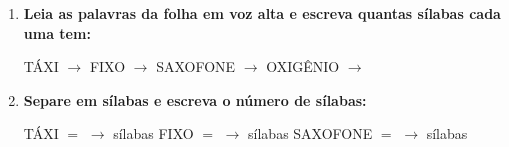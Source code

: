 \begin{exercicio}
\begin{enumerate}[resume]
  \item \textbf{Leia as palavras da folha em voz alta e escreva quantas sílabas cada uma tem:}

  \begin{center}
  TÁXI $\rightarrow$ \underline{\hspace{1cm}} \quad FIXO $\rightarrow$ \underline{\hspace{1cm}} \quad SAXOFONE $\rightarrow$ \underline{\hspace{1cm}} \quad OXIGÊNIO $\rightarrow$ \underline{\hspace{1cm}}
  \end{center}

  \item \textbf{Separe em sílabas e escreva o número de sílabas:}
  \begin{center}
  TÁXI $=$ \underline{\hspace{1.2cm}} $\rightarrow$ \underline{\hspace{0.8cm}} sílabas \quad FIXO $=$ \underline{\hspace{1.2cm}} $\rightarrow$ \underline{\hspace{0.8cm}} sílabas \quad SAXOFONE $=$ \underline{\hspace{1.2cm}} $\rightarrow$ \underline{\hspace{0.8cm}} sílabas
  \end{center}

\end{enumerate}

\end{exercicio}



